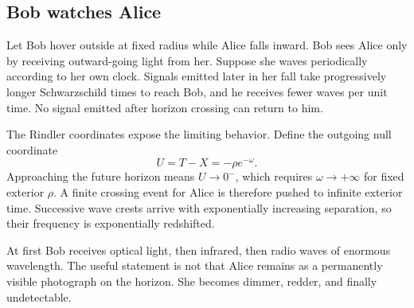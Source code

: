 \begin{classroomqa}
\end{classroomqa}

\begin{classroomqa}
\end{classroomqa}

\subsection{Bob watches Alice}

Let Bob hover outside at fixed radius while Alice falls inward. Bob sees Alice only by receiving outward-going light from her. Suppose she waves periodically according to her own clock. Signals emitted later in her fall take progressively longer Schwarzschild times to reach Bob, and he receives fewer waves per unit time. No signal emitted after horizon crossing can return to him.

The Rindler coordinates expose the limiting behavior. Define the outgoing null coordinate
\begin{equation}
U=T-X=-\rho e^{-\omega}.
\end{equation}
Approaching the future horizon means \(U\to0^{-}\), which requires \(\omega\to+\infty\) for fixed exterior \(\rho\). A finite crossing event for Alice is therefore pushed to infinite exterior time. Successive wave crests arrive with exponentially increasing separation, so their frequency is exponentially redshifted.

At first Bob receives optical light, then infrared, then radio waves of enormous wavelength. The useful statement is not that Alice remains as a permanently visible photograph on the horizon. She becomes dimmer, redder, and finally undetectable.


